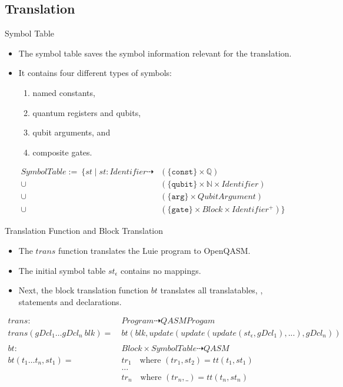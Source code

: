 \subsection{Translation}
\begin{frame}{Symbol Table}
    \begin{itemize}
        \item The symbol table saves the symbol information relevant for the translation.
        \item It contains four different types of symbols:
        \begin{enumerate}
            \item named constants,
            \item quantum registers and qubits,
            \item qubit arguments, and
            \item composite gates. 
        \end{enumerate} 
    \end{itemize}
    \begin{align*}
        SymbolTable := \ \{st \mid st : Identifier \dashrightarrow & (\{\texttt{const}\} \times \mathbb{Q})\\
        \cup& (\{\texttt{qubit}\} \times \mathbb{N} \times Identifier)\\
        \cup& (\{\texttt{arg}\} \times QubitArgument)\\
        \cup& (\{\texttt{gate}\} \times Block \times Identifier^+)
        \}
    \end{align*}
\end{frame}

\begin{frame}{Translation Function and Block Translation}
    \begin{itemize}
        \item The $trans$ function translates the Luie program to OpenQASM.
        \item The initial symbol table $st_\epsilon$ contains no mappings.
        \item Next, the block translation function $bt$ translates all translatables, \ie, statements and declarations.
    \end{itemize}
    \begin{align*}
        trans : \ & Program \dashrightarrow QASMProgam\\
        trans(gDcl_1 \dots gDcl_n \ blk) = \ & bt(blk, update(update(update(st_\epsilon, gDcl_1), ...), gDcl_n))\\
        &\\
        bt : \ & Block \times SymbolTable \dashrightarrow QASM\\
        bt(t_1 \dots t_n, st_1) = \ &  tr_1 \quad \text{where } (tr_1, st_2) = tt(t_1, st_1)\\
        & \dots\\
        & tr_n \quad \text{where } (tr_n, \_) = tt(t_n, st_n)
    \end{align*}
\end{frame}

